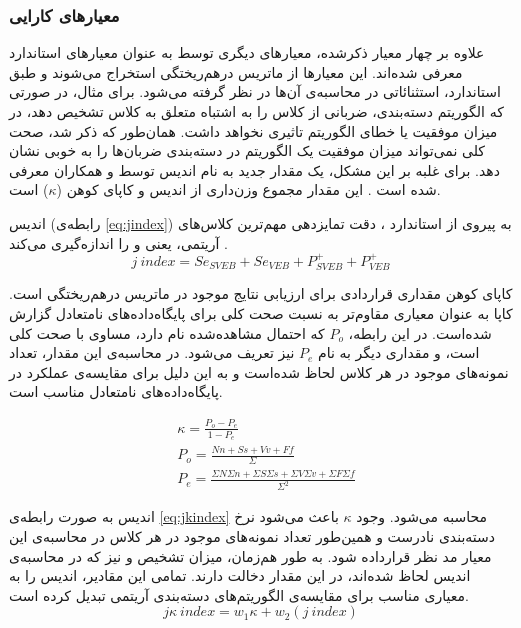 \subsubsection{معیارهای کارایی}
\label{subsec:perf}
علاوه بر چهار معیار ذکرشده، معیارهای دیگری توسط  به عنوان معیارهای استاندارد معرفی شده‌اند. این معیارها از ماتریس درهم‌ریختگی استخراج می‌شوند و طبق  استاندارد‌، استثنائاتی در محاسبه‌ی آن‌ها در نظر گرفته می‌شود. برای مثال، در صورتی که الگوریتم دسته‌بندی، ضربانی از کلاس  را به اشتباه متعلق به کلاس  تشخیص دهد، در میزان موفقیت یا خطای الگوریتم تاثیری نخواهد داشت. 
همان‌طور که ذکر شد، صحت کلی نمی‌تواند میزان موفقیت یک الگوریتم در دسته‌بندی ضربان‌ها را به خوبی نشان دهد. برای غلبه بر این مشکل، یک مقدار جدید به نام اندیس  توسط  و همکاران معرفی شده است \cite{Mar2011}. این مقدار مجموع وزن‌داری از اندیس  و کاپای کوهن ($\kappa$) است.

اندیس  (رابطه‌ی \ref{eq:jindex}) به پیروی از استاندارد ، دقت تمایزدهی مهم‌ترین کلاس‌های آریتمی، یعنی  و  را اندازه‌گیری می‌کند \cite{Mondejar}.
\begin{equation}
	j\:index = Se_{SVEB} + Se_{VEB} + P^+_{SVEB} + P^+_{VEB}
	\label{eq:jindex}
\end{equation}

کاپای کوهن مقداری قراردادی برای ارزیابی نتایج موجود در ماتریس درهم‌ریختگی است. کاپا به عنوان معیاری مقاوم‌تر به نسبت صحت کلی برای پایگاه‌داده‌های نامتعادل گزارش شده‌است. در این رابطه، $P_o$ که احتمال مشاهده‌شده نام دارد، مساوی با صحت کلی است،‌ و مقداری دیگر به نام $P_e$ نیز تعریف می‌شود. در محاسبه‌ی این مقدار، تعداد نمونه‌های موجود در هر کلاس لحاظ شده‌است و به این دلیل برای مقایسه‌ی عملکرد در پایگاه‌داده‌های نامتعادل مناسب است. 

\begin{equation}
\begin{split}
	& \kappa = \frac{P_o - P_e}{1 - P_e} \\
	& P_o = \frac{Nn+Ss+Vv+Ff}{\Sigma} \\
	& P_e = \frac{\Sigma N \Sigma n + \Sigma S \Sigma s + \Sigma V \Sigma v + \Sigma F \Sigma f}{\Sigma^2}
\end{split}
\end{equation}

اندیس  به صورت رابطه‌ی \ref{eq:jkindex} محاسبه می‌شود. وجود $\kappa$ باعث می‌شود نرخ دسته‌بندی نادرست و همین‌طور تعداد نمونه‌های موجود در هر کلاس در محاسبه‌ی این معیار مد نظر قرارداده شود. به طور هم‌زمان، میزان تشخیص  و  نیز که در محاسبه‌ی اندیس  لحاظ شده‌اند،‌ در این مقدار دخالت دارند. تمامی این مقادیر،‌ اندیس  را به معیاری مناسب برای مقایسه‌ی الگوریتم‌های دسته‌بندی آریتمی تبدیل کرده است.  
\begin{equation}
	j\kappa\:index = w_1\kappa + w_2(j\:index)
\label{eq:jkindex}
\end{equation}



